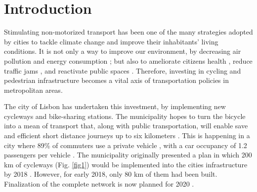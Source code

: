 \documentclass[information,article,submit,moreauthors,pdftex,10pt,a4paper]{mdpi}
\theoremstyle{mdpi}
\newcounter{ex}
\newcounter{re}
\theoremstyle{mdpidefinition}
\begin{document}


\section{Introduction}

Stimulating non-motorized transport has been one of the many strategies adopted by cities to tackle climate change \cite{Banister2011} and improve their inhabitants' living conditions. It is not only a way to improve our environment, by decreasing air pollution and energy consumption \cite{Fraser2011}; but also to ameliorate citizens health \cite{DeHartog2010}, reduce traffic jams \cite{Kosha2016}, and reactivate public spaces \cite{deManuelJerez2016LasAlcosa}. Therefore, investing in cycling and pedestrian infrastructure becomes a vital axis of transportation policies in metropolitan areas.

The city of Lisbon has undertaken this investment, by implementing new cycleways and bike-sharing stations. The municipality hopes to turn the bicycle into a mean of transport that, along with public transportation, will enable save and efficient short distance journeys up to six kilometers \cite{CamaraMunicipaldeLisboa}. This is happening in a city where 89\% of commuters use a private vehicle \cite{CamaraMunicipaldeLisboa2016}, with a car occupancy of 1.2 passengers per vehicle \cite{Silva2017}. The municipality originally presented a plan in which 200 km of cycleways (Fig. \ref{fig1}) would be implemented into the cities infrastructure by 2018 \cite{Susete2016}. However, for early 2018, only 80 km of them had been built. Finalization of the complete network is now planned for 2020 \cite{Andre2018}.
\end{document}
